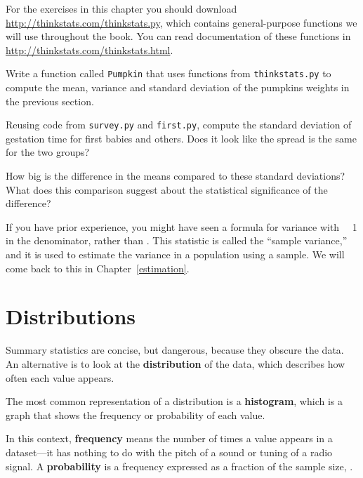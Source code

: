 \documentclass[12pt]{book}
\begin{document}
\begin{exercise}
For the exercises in this chapter you should download
\url{http://thinkstats.com/thinkstats.py}, which contains general-purpose
functions we will use throughout the book.  You can read documentation
of these functions in \url{http://thinkstats.com/thinkstats.html}.

Write a function called
{\tt Pumpkin} that uses functions from {\tt thinkstats.py} to compute
the mean, variance and standard deviation of the pumpkins weights in
the previous section.
\end{exercise}

\begin{exercise}
Reusing code from {\tt survey.py} and {\tt first.py}, compute the
standard deviation of gestation time for first babies and others.
Does it look like the spread is the same for the two groups?

How big is the difference in the means compared to these standard
deviations?  What does this comparison suggest about the statistical
significance of the difference?
\end{exercise}

If you have prior experience, you might have seen a formula for
variance with \n~\minus~1 in the denominator, rather than \n.  This
statistic is called the ``sample variance,'' and it is used to
estimate the variance in a population using a sample.  We will come
back to this in Chapter~\ref{estimation}.  

\section{Distributions}
\label{distributions}

Summary statistics are concise, but dangerous, because they obscure
the data.  An alternative is to look at the {\bf distribution} of the
data, which describes how often each value appears.

The most common representation of a distribution is a {\bf histogram},
which is a graph that shows the frequency or probability
of each value.

In this context, {\bf frequency} means the number of times a value
appears in a dataset---it has nothing to do with the pitch of a sound
or tuning of a radio signal.  A {\bf probability} is a frequency expressed
as a fraction of the sample size, \n.
\end{document}
